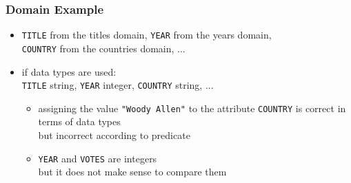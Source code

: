 \documentclass[dvipsnames]{beamer}
\theoremstyle{plain}
\begin{document}
\begin{frame}
  \frametitle{Domain Example}

  \begin{example}
    \begin{itemize}
      \item \texttt{TITLE} from the titles domain, \texttt{YEAR} from the years
        domain,\\
       \texttt{COUNTRY} from the countries domain, ...

      \pause
      \item if data types are used:\\
        \texttt{TITLE} string, \texttt{YEAR} integer, \texttt{COUNTRY} string, ...

      \begin{itemize}
        \item assigning the value \texttt{"Woody Allen"} to the attribute
	  \texttt{COUNTRY} is correct in terms of data types\\
	  but incorrect according to predicate

        \item \texttt{YEAR} and \texttt{VOTES} are integers\\
	  but it does not make sense to compare them
      \end{itemize}
    \end{itemize}
  \end{example}
\end{frame}
\end{document}
